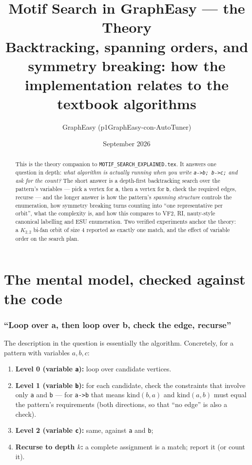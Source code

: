 \documentclass[11pt,a4paper]{article}
\title{\bfseries Motif Search in GraphEasy --- the Theory\\[2mm]
\large Backtracking, spanning orders, and symmetry breaking: how the implementation
relates to the textbook algorithms}
\author{GraphEasy (p1GraphEasy-con-AutoTuner)}
\date{September 2026}
\newcommand{\code}[1]{\texttt{#1}}
\newcommand{\file}[1]{\texttt{#1}}
\begin{document}
\maketitle

\begin{abstract}
\noindent
This is the theory companion to \file{MOTIF\_SEARCH\_EXPLAINED.tex}. It answers
one question in depth: \emph{what algorithm is actually running when you write
\code{a->b; b->c;} and ask for the count?} The short answer is a depth-first
backtracking search over the pattern's variables --- pick a vertex for \code{a},
then a vertex for \code{b}, check the required edges, recurse --- and the longer
answer is how the pattern's \emph{spanning structure} controls the enumeration,
how symmetry breaking turns counting into ``one representative per orbit'',
what the complexity is, and how this compares to VF2, RI, nauty-style canonical
labelling and ESU enumeration. Two verified experiments anchor the theory: a
$K_{2,2}$ bi-fan orbit of size 4 reported as exactly one match, and the effect
of variable order on the search plan.
\end{abstract}

\tableofcontents

\part{The mental model, checked against the code}

\section{``Loop over a, then loop over b, check the edge, recurse''}

The description in the question is essentially the algorithm. Concretely, for a
pattern with variables $a,b,c$:

\begin{enumerate}
  \item \textbf{Level 0 (variable \code{a}):} loop over candidate vertices.
  \item \textbf{Level 1 (variable \code{b}):} for each candidate, check the
        constraints that involve only \code{a} and \code{b} --- for
        \code{a->b} that means $\mathrm{kind}(b,a)$ and $\mathrm{kind}(a,b)$ must
        equal the pattern's requirements (both directions, so that ``no edge'' is
        also a check).
  \item \textbf{Level 2 (variable \code{c}):} same, against \code{a} and \code{b};
  \item \textbf{Recurse to depth $k$:} a complete assignment is a match; report it
        (or count it).
\end{enumerate}
\end{document}
